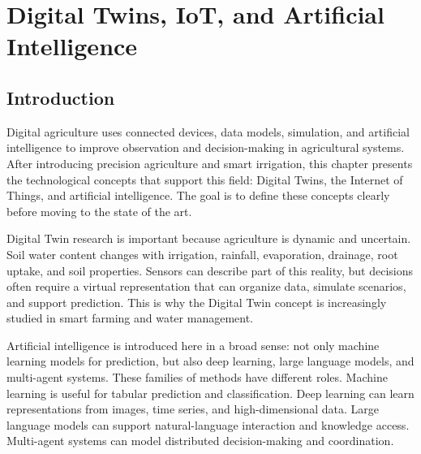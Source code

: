 \chapter{Digital Twins, IoT, and Artificial Intelligence}

\providecommand{\selectedFigureBox}[3]{%
\fbox{\begin{minipage}{0.86\textwidth}
\centering
\vspace{0.35cm}
Selected figure: #1\\[0.15cm]
Save the downloaded image as:\\
\texttt{\detokenize{#2}}\\[0.15cm]
Paper link:\\
\url{#3}
\vspace{0.35cm}
\end{minipage}}}

\section{Introduction}

Digital agriculture uses connected devices, data models, simulation, and artificial intelligence to improve observation and decision-making in agricultural systems. After introducing precision agriculture and smart irrigation, this chapter presents the technological concepts that support this field: Digital Twins, the Internet of Things, and artificial intelligence. The goal is to define these concepts clearly before moving to the state of the art.

Digital Twin research is important because agriculture is dynamic and uncertain. Soil water content changes with irrigation, rainfall, evaporation, drainage, root uptake, and soil properties. Sensors can describe part of this reality, but decisions often require a virtual representation that can organize data, simulate scenarios, and support prediction. This is why the Digital Twin concept is increasingly studied in smart farming and water management.

Artificial intelligence is introduced here in a broad sense: not only machine learning models for prediction, but also deep learning, large language models, and multi-agent systems. These families of methods have different roles. Machine learning is useful for tabular prediction and classification. Deep learning can learn representations from images, time series, and high-dimensional data. Large language models can support natural-language interaction and knowledge access. Multi-agent systems can model distributed decision-making and coordination.

